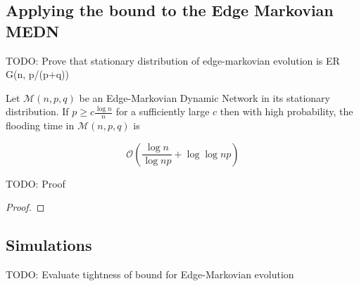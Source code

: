 \subsection{Applying the bound to the Edge Markovian MEDN}\label{subsect:floodingBoundEdgeMarkovian}

TODO: Prove that stationary distribution of edge-markovian evolution is ER G(n, p/(p+q))

\begin{theorem}
	Let $\mathcal{M}(n, p, q)$ be an Edge-Markovian Dynamic Network in its stationary distribution. If $p \geq c \frac{\log n}{n}$ for a sufficiently large $c$ then with high probability, the flooding time in $\mathcal{M}(n, p, q)$ is 

	$$
		\mathcal{O}\left(\frac{\log n}{\log np} + \log \log np \right)
	$$
\end{theorem}

TODO: Proof

\begin{proof}
	
\end{proof}


\subsection{Simulations}

TODO: Evaluate tightness of bound for Edge-Markovian evolution